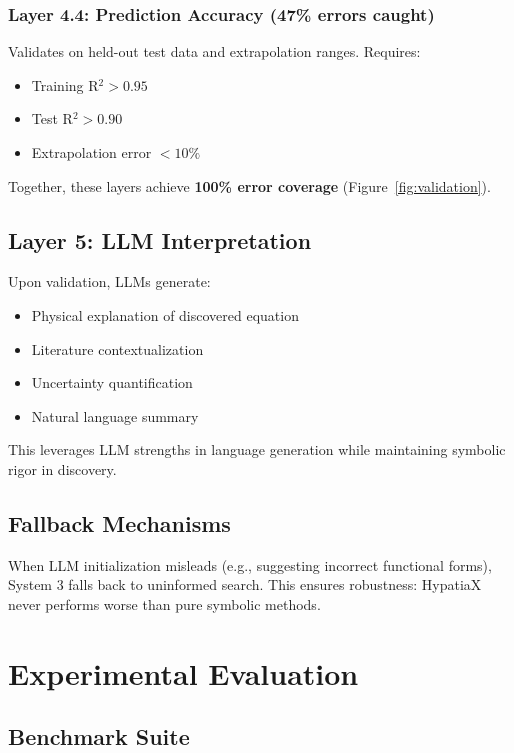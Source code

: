\documentclass[twoside,11pt]{article}
\begin{document}
\subsubsection{Layer 4.4: Prediction Accuracy (47\% errors caught)}

Validates on held-out test data and extrapolation ranges. Requires:
\begin{itemize}
\item Training R$^2 > 0.95$
\item Test R$^2 > 0.90$
\item Extrapolation error $< 10\%$
\end{itemize}

Together, these layers achieve \textbf{100\% error coverage} (Figure~\ref{fig:validation}).

\subsection{Layer 5: LLM Interpretation}

Upon validation, LLMs generate:
\begin{itemize}
\item Physical explanation of discovered equation
\item Literature contextualization
\item Uncertainty quantification
\item Natural language summary
\end{itemize}

This leverages LLM strengths in language generation while maintaining symbolic rigor in discovery.

\subsection{Fallback Mechanisms}

When LLM initialization misleads (e.g., suggesting incorrect functional forms), System 3 falls back to uninformed search. This ensures robustness: HypatiaX never performs worse than pure symbolic methods.

\section{Experimental Evaluation}
\label{sec:experiments}

\subsection{Benchmark Suite}
\end{document}
